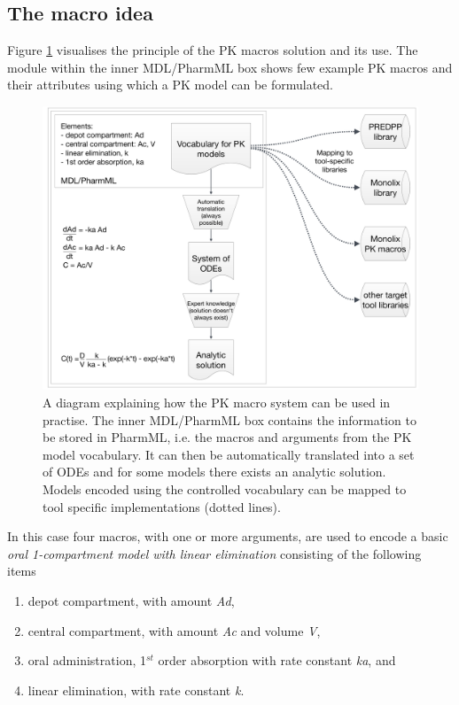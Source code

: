 \subsection{The macro idea}
Figure \ref{fig:flowDiagram} visualises the principle of the PK macros solution and its use. The module 
within the inner MDL/PharmML box shows few example PK macros and their attributes using which a 
PK model can be formulated. 
\begin{figure}[htb!]
\centering
  \includegraphics[width=160mm]{pics/PKmacrosPrinciple.pdf}
 \caption{A diagram explaining how the PK macro system can be used in practise. The inner 
 MDL/PharmML box contains the information to be stored in PharmML, i.e. the macros and arguments 
 from the PK model vocabulary. It can then be automatically translated into a set of ODEs and for some 
 models there exists an analytic solution. Models encoded using the controlled vocabulary can be 
 mapped to tool specific implementations (dotted lines).}
 \label{fig:flowDiagram}
\end{figure}
In this case four macros, with one or more arguments, are used to encode a basic \emph{oral 1-compartment 
model with linear elimination} consisting of the following items
\begin{enumerate}
\item
depot compartment, with amount \emph{Ad},
\item
central compartment, with amount \emph{Ac} and volume \emph{V},
\item
oral administration, 1$^{st}$ order absorption with rate constant \emph{ka}, and 
\item
linear elimination, with rate constant \emph{k}.
\end{enumerate}
